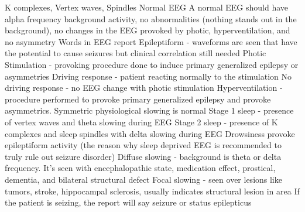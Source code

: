 \documentclass[12pt]{article}
\begin{document}
K complexes, Vertex waves, Spindles
Normal EEG
A normal EEG should have alpha frequency background activity, no abnormalities (nothing stands out in the background), no changes in the EEG provoked by photic, hyperventilation, and no asymmetry  
Words in EEG report 
Epileptiform - waveforms are seen that have the potential to cause seizures but clinical correlation still needed
Photic Stimulation - provoking procedure done to induce primary generalized epilepsy or asymmetries 
Driving response - patient reacting normally to the stimulation 
No driving response - no EEG change with photic stimulation 
Hyperventilation - procedure performed to provoke primary generalized epilepsy and provoke asymmetrics. Symmetric physiological slowing is normal 
 Stage 1 sleep - presence of vertex waves and theta slowing during EEG
Stage 2 sleep - presence of K complexes and sleep spindles with delta slowing during EEG
Drowsiness provoke epileptiform activity (the reason why sleep deprived EEG is recommended to truly rule out seizure disorder)
Diffuse slowing - background is theta or delta frequency. It’s seen with encephalopathic state, medication effect, prostical, dementia, and bilateral structural defect
Focal slowing - seen over lesions like tumors, stroke, hippocampal sclerosis, usually indicates structural lesion in area
If the patient is seizing, the report will say seizure or status epilepticus 
\end{document}
